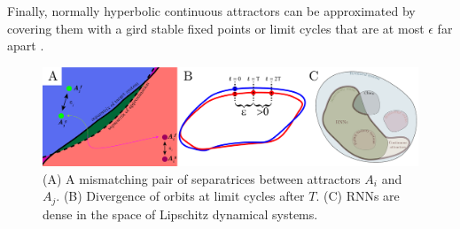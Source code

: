\documentclass[10pt]{article}
\begin{document}
Finally, normally hyperbolic continuous attractors can be approximated by covering them with a gird stable fixed points or limit cycles that are at most $\epsilon$ far apart \citep{Sagodi2024a}.

\begin{figure}[tbhp]
  \centering
  \includegraphics[width=\textwidth]{icmns2025_figure}
  \caption{(A) 	A mismatching pair of separatrices between attractors $A_i$ and $A_j$.
  		(B) Divergence of orbits at limit cycles after $T$.
  		(C) RNNs are dense in the space of Lipschitz dynamical systems.
  }\label{fig:figure}
\end{figure}


\end{document}
